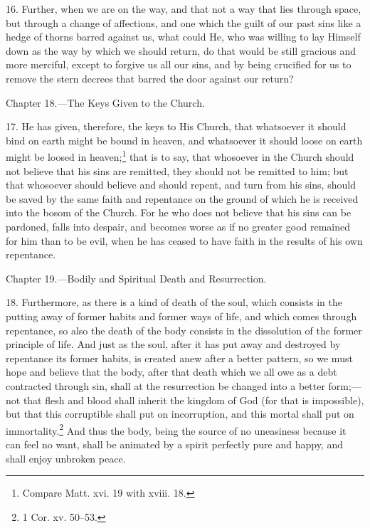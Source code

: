 16. Further, when we are on the way, and that not a way that lies through space, but through a change of affections, and one which the guilt of our past sins like a hedge of thorns barred against us, what could He, who was willing to lay Himself down as the way by which we should return, do that would be still gracious and more merciful, except to forgive us all our sins, and by being crucified for us to remove the stern decrees that barred the door against our return?


Chapter 18.—The Keys Given to the Church.

17. He has given, therefore, the keys to His Church, that whatsoever it should bind on earth might be bound in heaven, and whatsoever it should loose on earth might be loosed in heaven;\footnote{Compare Matt. xvi. 19 with xviii. 18.} that is to say, that whosoever in the Church should not believe that his sins are remitted, they should not be remitted to him; but that whosoever should believe and should repent, and turn from his sins, should be saved by the same faith and repentance on the ground of which he is received into the bosom of the Church. For he who does not believe that his sins can be pardoned, falls into despair, and becomes worse as if no greater good remained for him than to be evil, when he has ceased to have faith in the results of his own repentance.


Chapter 19.—Bodily and Spiritual Death and Resurrection.

18. Furthermore, as there is a kind of death of the soul, which consists in the putting away of former habits and former ways of life, and which comes through repentance, so also the death of the body consists in the dissolution of the former principle of life. And just as the soul, after it has put away and destroyed by repentance its former habits, is created anew after a better pattern, so we must hope and believe that the body, after that death which we all owe as a debt contracted through sin, shall at the resurrection be changed into a better form;—not that flesh and blood shall inherit the kingdom of God (for that is impossible), but that this corruptible shall put on incorruption, and this mortal shall put on immortality.\footnote{1 Cor. xv. 50–53.} And thus the body, being the source of no uneasiness because it can feel no want, shall be animated by a spirit perfectly pure and happy, and shall enjoy unbroken peace.

